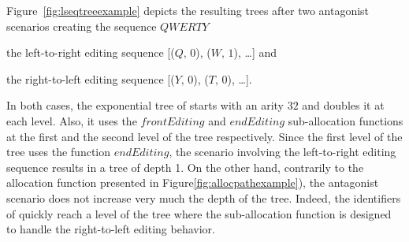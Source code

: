 
\begin{table*}
  \centering
  
  \caption{\label{table:lseqcomplexities}
    Upper-bound on space and time complexities of \LSEQ. Where $I$ is the number
    of insert operations performed.}
\end{table*}


\begin{figure*}
  \centering
  \subfloat {}
  \hspace{10pt}
  \subfloat {}
  \caption{\label{fig:lseqtreeexample}\LSEQ tree handling two monotonic
    editing behaviors.}
\end{figure*}


Figure~\ref{fig:lseqtreeexample} depicts the resulting trees after two
antagonist scenarios creating the sequence $QWERTY$
\begin{inparaenum}[(i)] 
\item the left-to-right editing sequence [($Q,\,0$), ($W,\,1$), \ldots] and
\item the right-to-left editing sequence [($Y,\,0$), ($T,\,0$), \ldots].
\end{inparaenum}
In both cases, the exponential tree of \LSEQ starts with an arity $32$ and
doubles it at each level. Also, it uses the $frontEditing$ and $endEditing$
sub-allocation functions at the first and the second level of the tree
respectively. Since the first level of the tree uses the function $endEditing$,
the scenario involving the left-to-right editing sequence results in a tree of
depth 1. On the other hand, contrarily to the allocation function presented in
Figure\ref{fig:allocpathexample}), the antagonist scenario does not increase
very much the depth of the tree. Indeed, the identifiers of \LSEQ quickly reach
a level of the tree where the sub-allocation function is designed to handle the
right-to-left editing behavior.




